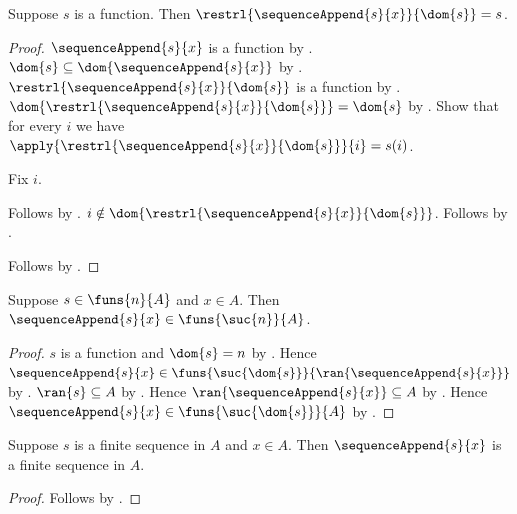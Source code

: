 \begin{proposition}\label{sequence_append_restriction}
    Suppose $s$ is a function.
    Then $\restrl{\sequenceAppend{s}{x}}{\dom{s}}=s$.
\end{proposition}
\begin{proof}
    $\sequenceAppend{s}{x}$ is a function
        by .
    $\dom{s}\subseteq\dom{\sequenceAppend{s}{x}}$
        by .
    $\restrl{\sequenceAppend{s}{x}}{\dom{s}}$ is a function
        by .
    $\dom{\restrl{\sequenceAppend{s}{x}}{\dom{s}}}=\dom{s}$
        by .
    Show that for every $i$ we have
        $\apply{\restrl{\sequenceAppend{s}{x}}{\dom{s}}}{i}=s(i)$.
    \begin{subproof}
        Fix $i$.
        \begin{byCase}
            Follows by
                .
            $i\notin\dom{\restrl{\sequenceAppend{s}{x}}{\dom{s}}}$.
            Follows by .
        \end{byCase}
    \end{subproof}
    Follows by .
\end{proof}

\begin{proposition}\label{sequence_append_typed}
    Suppose $s\in\funs{n}{A}$ and $x\in A$.
    Then $\sequenceAppend{s}{x}\in\funs{\suc{n}}{A}$.
\end{proposition}
\begin{proof}
    $s$ is a function and $\dom{s}=n$ by .
    Hence $\sequenceAppend{s}{x}\in
        \funs{\suc{\dom{s}}}{\ran{\sequenceAppend{s}{x}}}$
        by .
    $\ran{s}\subseteq A$ by .
    Hence $\ran{\sequenceAppend{s}{x}}\subseteq A$
        by .
    Hence $\sequenceAppend{s}{x}\in\funs{\suc{\dom{s}}}{A}$
        by .
\end{proof}

\begin{corollary}\label{sequence_append_finite_sequence}
    Suppose $s$ is a finite sequence in $A$ and $x\in A$.
    Then $\sequenceAppend{s}{x}$ is a finite sequence in $A$.
\end{corollary}
\begin{proof}
    Follows by
        .
\end{proof}

